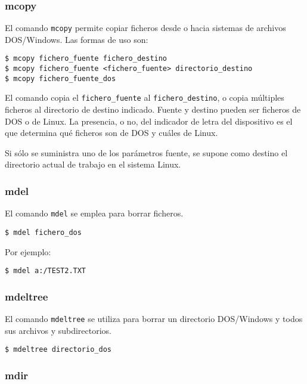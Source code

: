 \subsubsection{mcopy}

El comando {\tt mcopy} permite  copiar ficheros desde o hacia sistemas
de archivos DOS/Windows. Las formas de uso son:

\begin{verbatim} 
$ mcopy fichero_fuente fichero_destino
$ mcopy fichero_fuente <fichero_fuente> directorio_destino
$ mcopy fichero_fuente_dos
\end{verbatim}

El comando copia el {\tt fichero\_fuente} al {\tt fichero\_destino}, o
copia múltiples ficheros  al directorio de destino  indicado. Fuente y
destino pueden ser ficheros de DOS o de Linux. La presencia, o no, del
indicador de  letra del dispositivo  es el que determina  qué ficheros
son de DOS y cuáles de Linux.

Si sólo  se suministra uno  de los  parámetros fuente, se  supone como
destino el directorio actual de trabajo en el sistema Linux.

\subsubsection{mdel}

El comando {\tt mdel} se emplea para borrar ficheros.

\begin{verbatim}
$ mdel fichero_dos
\end{verbatim}

Por ejemplo:

\begin{verbatim}
$ mdel a:/TEST2.TXT
\end{verbatim}

\subsubsection{mdeltree}

El  comando  {\tt  mdeltree}  se utiliza  para  borrar  un  directorio
DOS/Windows y todos sus archivos y subdirectorios.

\begin{verbatim}
$ mdeltree directorio_dos
\end{verbatim}

\subsubsection{mdir}

